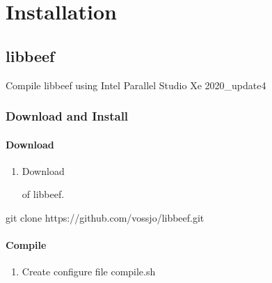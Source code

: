 \documentclass[a4paper,12pt,english]{sphinxmanual}
\begin{document}
\chapter{Installation}
\label{\detokenize{compile:installation}}\label{\detokenize{compile::doc}}

\section{libbeef}
\label{\detokenize{compile:libbeef}}
\sphinxAtStartPar
Compile libbeef using Intel Parallel Studio Xe 2020\_update4


\subsection{Download and Install}
\label{\detokenize{compile/libbeef:download-and-install}}\label{\detokenize{compile/libbeef::doc}}

\subsubsection{Download}
\label{\detokenize{compile/libbeef:download}}\begin{enumerate}
%
\item {} 
\sphinxAtStartPar
Download %
\begin{footnote}[13]\sphinxAtStartFootnote
{}
%
\end{footnote} of libbeef.

\end{enumerate}

\begin{sphinxVerbatim}[commandchars=\\\{\}]
git clone https://github.com/vossjo/libbeef.git
\end{sphinxVerbatim}


\subsubsection{Compile}
\label{\detokenize{compile/libbeef:compile}}\begin{enumerate}
%
\item {} 
\sphinxAtStartPar
Create configure file compile.sh

\end{enumerate}
\end{document}
